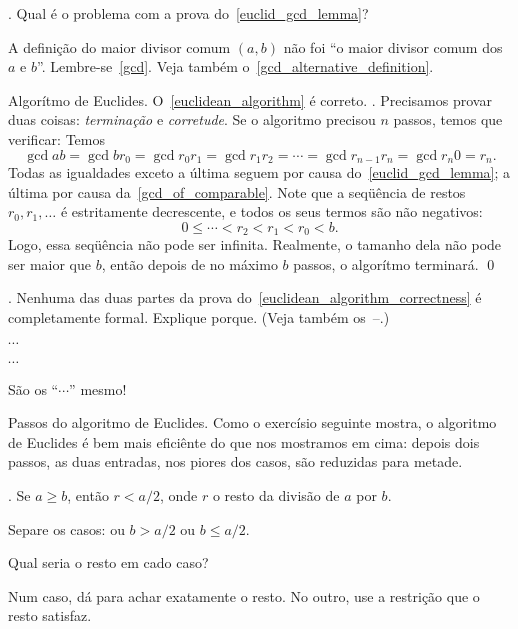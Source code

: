 \exercise.
Qual é o problema com a prova do~\ref{euclid_gcd_lemma}?

\solution
A definição do maior divisor comum $(a,b)$ não foi ``o maior divisor comum dos $a$ e $b$''.
Lembre-se~\ref{gcd}.  Veja também o~\ref{gcd_alternative_definition}.

\endexercise

\theorem Algorítmo de Euclides.
\label{euclidean_algorithm_correctness}
O~\ref{euclidean_algorithm} é correto.
\proof.
Precisamos provar duas coisas: \emph{terminação\/}\/ e \emph{corretude}.
\endgraf
{}
Se o algoritmo precisou $n$ passos, temos que verificar:
Temos
$$
\gcd a b
= \gcd b {r_0}
= \gcd {r_0} {r_1}
= \gcd {r_1} {r_2}
= \dotsb
= \gcd {r_{n-1}} {r_n}
= \gcd {r_n} 0
= r_n.
$$
Todas as igualdades exceto a última seguem por causa do~\ref{euclid_gcd_lemma};
a última por causa da~\ref{gcd_of_comparable}.
\endgraf
{}
Note que a seqüência de restos $r_0, r_1, \ldots$ é estritamente
decrescente, e todos os seus termos são não negativos:
$$
0\leq \dotsb < r_2 < r_1 < r_0 < b.
$$
Logo, essa seqüência não pode ser infinita.
Realmente, o tamanho dela não pode ser maior que $b$,
então depois de no máximo $b$ passos, o algorítmo terminará.
\qed

\exercise.
\label{euclidean_algorithm_proof_why_informal}
Nenhuma das duas partes da prova do~\ref{euclidean_algorithm_correctness}
é completamente formal.  Explique porque.
(Veja também os~--.)

\hint ${}\dotsb{}$

\hint ${}\dotsb{}$

\solution
São os ``${}\dotsb{}$'' mesmo!

\endexercise

\note Passos do algoritmo de Euclides.
Como o exercísio seguinte mostra, o algoritmo de Euclides
é bem mais eficiênte do que nos mostramos em cima:
depois dois passos, as duas entradas, nos piores dos casos,
são reduzidas para metade.

\exercise.
Se $a \geq b$, então $r < a/2$, onde $r$ o resto da divisão de $a$ por $b$.

\hint Separe os casos: ou $b > a/2$ ou $b \leq a/2$.

\hint Qual seria o resto em cado caso?

\hint Num caso, dá para achar exatamente o resto.
No outro, use a restrição que o resto satisfaz.

